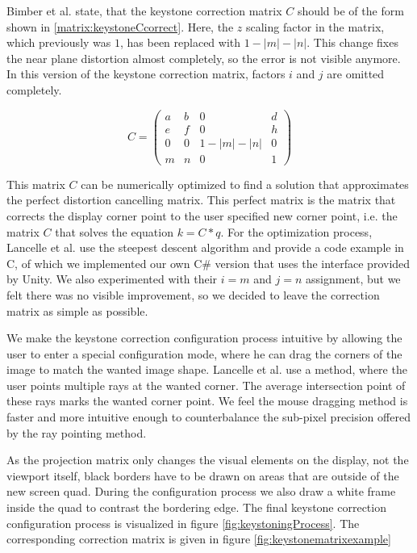 \documentclass[12pt,a4paper,oneside,pdftex]{report}
\begin{document}
Bimber et al. \cite{bimber2005spatial} state, that the keystone correction matrix $C$ should be of the form shown in \eqref{matrix:keystoneCcorrect}. Here, the $z$ scaling factor in the matrix, which previously was $1$, has been replaced with $1 - |m| - |n|$. This change fixes the near plane distortion almost completely, so the error is not visible anymore. In this version of the keystone correction matrix, factors $i$ and $j$ are omitted completely.

\begin{equation}
\label{matrix:keystoneCcorrect}
C = \begin{pmatrix}
  a & b & 0 & d \\[0.3em]
  e & f & 0 & h \\[0.3em]
  0 & 0 & 1 - |m| - |n| & 0 \\[0.3em]
  m & n & 0 & 1
 \end{pmatrix}
 \end{equation}
 
This matrix $C$ can be numerically optimized to find a solution that approximates the perfect distortion cancelling matrix. This perfect matrix is the matrix that corrects the display corner point to the user specified new corner point, i.e. the matrix $C$ that solves the equation $k = C * q$. For the optimization process, Lancelle et al. use the steepest descent algorithm and provide a code example in C, of which we implemented our own C\# version that uses the interface provided by Unity. We also experimented with their $i = m$ and $j = n$ assignment, but we felt there was no visible improvement, so we decided to leave the correction matrix as simple as possible.

We make the keystone correction configuration process intuitive by allowing the user to enter a special configuration mode, where he can drag the corners of the image to match the wanted image shape. Lancelle et al. use a method, where the user points multiple rays at the wanted corner. The average intersection point of these rays marks the wanted corner point. We feel the mouse dragging method is faster and more intuitive enough to counterbalance the sub-pixel precision offered by the ray pointing method.  

As the projection matrix only changes the visual elements on the display, not the viewport itself, black borders have to be drawn on areas that are outside of the new screen quad. During the configuration process we also draw a white frame inside the quad to contrast the bordering edge. The final keystone correction configuration process is visualized in figure \ref{fig:keystoningProcess}. The corresponding correction matrix is given in figure \ref{fig:keystonematrixexample}
\end{document}
